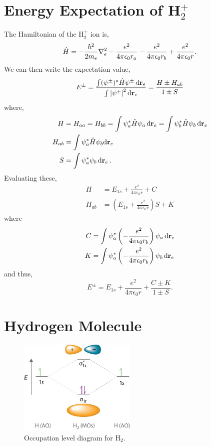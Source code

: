 \documentclass{book}
\begin{document}
\section{Energy Expectation of H$_2^+$}
The Hamiltonian of the H$_2^+$ ion is,
\begin{equation}
	\hat{H} = -\frac{\hbar^2}{2m_e}\laplacian_e -\frac{e^2}{4\pi \epsilon_0 r_a} -\frac{e^2}{4\pi \epsilon_0 r_b} + \frac{e^2}{4\pi \epsilon_0 r}.
\end{equation}
We can then write the expectation value,
\begin{equation}
	E^{\pm} = \frac{\int(\psi^{\pm})^*\hat{H}\psi^{\pm}\dd{\vb{r}}_e}{\int\abs{\psi^{\pm}}^2\dd{\vb{r}_e}} = \frac{H \pm H_{ab}}{1 \pm S}
\end{equation}
where,
\begin{align}
	H & = H_{aa} = H_{bb} = \int\psi_a^*\hat{H}\psi_a\dd{\vb{r}_e} = \int\psi_b^*\hat{H}\psi_b\dd{\vb{r}_e} \\
	H_{ab} & = \int\psi_a^*\hat{H}\psi_b \dd\vb{r}_e \\
	S & = \int\psi_a^*\psi_b\dd{\vb{r}_e}.
\end{align}
Evaluating these,
\begin{align}
	H & = E_{1s} + \frac{e^2}{4\pi\epsilon_0r} + C \\
	H_{ab} & = \left(E_{1s} + \frac{e^2}{4\pi\epsilon_0r}\right)S + K
\end{align}
where 
\begin{align}
	C & = \int\psi^*_a\left(-\frac{e^2}{4\pi\epsilon_0r_b}\right)\psi_a \dd{\vb{r}_e} \\
	K & = \int\psi_a^*\left(-\frac{e^2}{4\pi\epsilon_0r_b}\right)\psi_b\dd{\vb{r}}_e
\end{align}
and thus,
\begin{equation}
	E^{\pm} = E_{1s} + \frac{e^2}{4\pi\epsilon_0r} + \frac{C\pm K}{1\pm S}.
\end{equation}
\section{Hydrogen Molecule}
\begin{figure}[h]
	\centering
	\includegraphics[width=0.5\textwidth]{mol.jpg}
	\caption{Occupation level diagram for H$_2$.}
	\label{fig:mol}
\end{figure}
\end{document}
